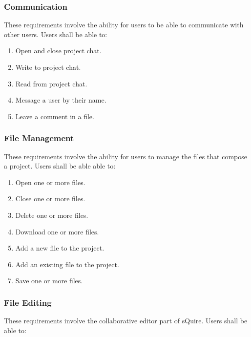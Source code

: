 \documentclass[twoside,letterpaper]{article}
\begin{document}
{\subsubsection{Communication}

These requirements involve the ability for users to be able to communicate with other users. Users shall be able to:

\begin{enumerate}
	\item Open and close project chat.
	\item Write to project chat.
	\item Read from project chat.
	\item Message a user by their name.
	\item Leave a comment in a file.
\end{enumerate}

\subsubsection{File Management}

These requirements involve the ability for users to manage the files that compose a project. Users shall be able able to:

\begin{enumerate}
	\item Open one or more files.
	\item Close one or more files.
	\item Delete one or more files.
	\item Download one or more files.
	\item Add a new file to the project.
	\item Add an existing file to the project.
	\item Save one or more files.
\end{enumerate}

\subsubsection{File Editing}

These requirements involve the collaborative editor part of sQuire. Users shall be able to:

}
\end{document}
